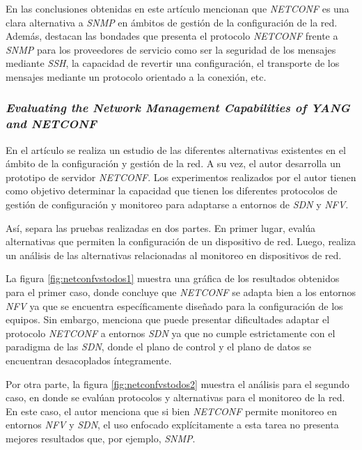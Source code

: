 En las conclusiones obtenidas en este artículo mencionan que \textit{NETCONF} es una clara alternativa a \textit{SNMP} en ámbitos de gestión de la configuración de la red. Además, destacan las bondades que presenta el protocolo \textit{NETCONF} frente a \textit{SNMP} para los proveedores de servicio como ser la seguridad de los mensajes mediante \textit{SSH}, la capacidad de revertir una configuración, el transporte de los mensajes mediante un protocolo orientado a la conexión, etc.



\subsubsection*{\textit{Evaluating the Network Management Capabilities of YANG and NETCONF}}

En el artículo \parencite{netconfvstodos} se realiza un estudio de las diferentes alternativas existentes en el ámbito de la configuración y gestión de la red. A su vez, el autor desarrolla un prototipo de servidor \textit{NETCONF}. Los experimentos realizados por el autor tienen como objetivo determinar la capacidad que tienen los diferentes protocolos de gestión de configuración y monitoreo para adaptarse a entornos de \textit{SDN} y \textit{NFV}. 

Así, separa las pruebas realizadas en dos partes. En primer lugar, evalúa alternativas que permiten la configuración de un dispositivo de red. Luego, realiza un análisis de las alternativas relacionadas al monitoreo en dispositivos de red.

La figura \ref{fig:netconfvstodos1} muestra una gráfica de los resultados obtenidos para el primer caso, donde concluye que \textit{NETCONF} se adapta bien a los entornos \textit{NFV} ya que se encuentra específicamente diseñado para la configuración de los equipos. Sin embargo, menciona que puede presentar dificultades adaptar el protocolo \textit{NETCONF} a entornos \textit{SDN} ya que no cumple estrictamente con el paradigma de las \textit{SDN}, donde el plano de control y el plano de datos se encuentran desacoplados íntegramente.

Por otra parte, la figura \ref{fig:netconfvstodos2} muestra el análisis para el segundo caso, en donde se evalúan protocolos y alternativas para el monitoreo de la red. En este caso, el autor menciona que si bien \textit{NETCONF} permite monitoreo en entornos \textit{NFV} y \textit{SDN}, el uso enfocado explícitamente a esta tarea no presenta mejores resultados que, por ejemplo, \textit{SNMP}.


